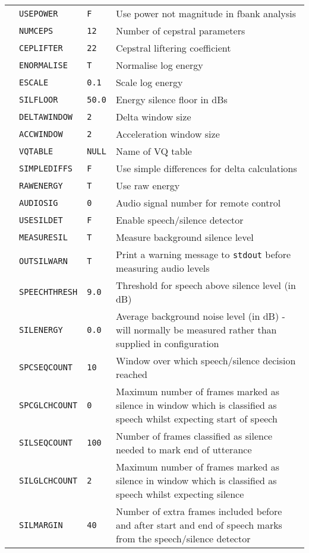 \begin{center}
\begin{supertabular}{|p{1.8cm}|l|l|p{6.6cm}|}
  & \texttt{USEPOWER}  & \texttt{F} & Use power not magnitude in fbank analysis \\ 
  & \texttt{NUMCEPS}   & \texttt{12} & Number of cepstral parameters \\  
  & \texttt{CEPLIFTER} &   \texttt{22} & Cepstral liftering coefficient \\ 
  & \texttt{ENORMALISE} & \texttt{T} & Normalise log energy \\  
  & \texttt{ESCALE} & \texttt{0.1} & Scale log energy \\   
  & \texttt{SILFLOOR} & \texttt{50.0} & Energy silence floor in dBs \\   
  & \texttt{DELTAWINDOW} & \texttt{2} & Delta window size \\  
  & \texttt{ACCWINDOW} & \texttt{2} & Acceleration window size \\  
  & \texttt{VQTABLE} & \texttt{NULL} & Name of VQ table \\  
  & \texttt{SIMPLEDIFFS} & \texttt{F} & Use simple differences for delta calculations \\ 
  & \texttt{RAWENERGY}  & \texttt{T} & Use raw energy \\ 
  & \texttt{AUDIOSIG} & \texttt{0} & Audio signal number for remote control \\ 
  & \texttt{USESILDET}  & \texttt{F} & Enable speech/silence detector \\ 
  & \texttt{MEASURESIL} & \texttt{T} & Measure background silence level \\ 
  & \texttt{OUTSILWARN} & \texttt{T} & Print a warning message to {\tt stdout} before 
measuring audio levels \\ 
  & \texttt{SPEECHTHRESH} & \texttt{9.0} & Threshold for speech above silence level (in dB) \\ 
  & \texttt{SILENERGY}    & \texttt{0.0} & Average background noise level (in dB) - will 
normally be measured rather than supplied in configuration \\ 
  & \texttt{SPCSEQCOUNT}  & \texttt{10} & Window over which speech/silence decision reached \\ 
  & \texttt{SPCGLCHCOUNT} & \texttt{0} & Maximum number of frames marked as silence in window which is
  classified as speech whilst expecting start of speech \\   
  & \texttt{SILSEQCOUNT}  & \texttt{100} & Number of frames classified as silence needed to mark end of
  utterance \\ 
  & \texttt{SILGLCHCOUNT} & \texttt{2} & Maximum number of frames marked as silence in window which is
  classified as speech whilst expecting silence \\   
  & \texttt{SILMARGIN} & \texttt{40} & Number of extra frames included before and after start and end of
  speech marks from the speech/silence detector \\ \hline


\end{supertabular}
\end{center}

